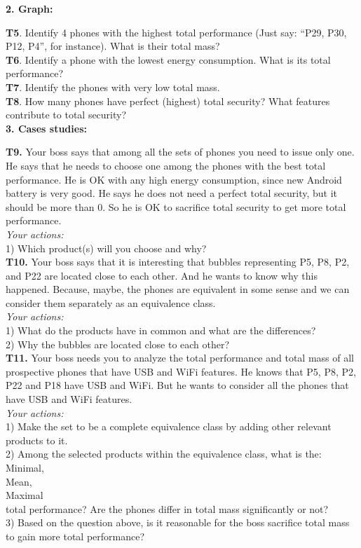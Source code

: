 \documentclass{acm_proc_article-sp}
\begin{document}
\textbf{2. Graph:}

\textbf{T5}. Identify 4 phones with the highest total performance (Just say: “P29, P30, P12, P4”, for instance). What is their total mass?\\
\textbf{T6}. Identify a phone with the lowest energy consumption. What is its total performance?\\
\textbf{T7}. Identify the phones with very low total mass.\\
\textbf{T8}. How many phones have perfect (highest) total security? What features contribute to total security?\\

\textbf{3. Cases studies:}

\textbf{T9.} Your boss says that among all the sets of phones you need to issue only one. He says that he needs to choose one among the phones with the best total performance. He is OK with any high energy consumption, since new Android battery is very good. He says he does not need a perfect total security, but it should be more than 0. So he is OK to sacrifice total security to get more total performance.\\
\textit{Your actions:}\\
1) Which product(s) will you choose and why?\\

\textbf{T10.} Your boss says that it is interesting that bubbles representing P5, P8, P2, and P22 are located close to each other. And he wants to know why this happened. Because, maybe, the phones are equivalent in some sense and we can consider them separately as an equivalence class.\\
\textit{Your actions:}\\
1) What do the products have in common and what are the differences?\\
2) Why the bubbles are located close to each other?\\

\textbf{T11.} Your boss needs you to analyze the total performance and total mass of all prospective phones that have USB and WiFi features. He knows that P5, P8, P2, P22 and P18 have USB and WiFi. But he wants to consider all the phones that have USB and WiFi features.\\
\textit{Your actions:}\\
1) Make the set to be a complete equivalence class by adding other relevant products to it.\\
2) Among the selected products within the equivalence class, what is the:\\
	Minimal,\\
	Mean,\\
	Maximal\\
total performance? Are the phones differ in total mass significantly or not?\\
3) Based on the question above, is it reasonable for the boss sacrifice total mass to gain more total performance?\\
\end{document}

